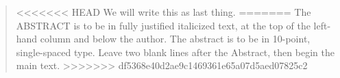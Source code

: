 \begin{abstract}
<<<<<<< HEAD
We will write this as last thing.
=======
The ABSTRACT is to be in fully justified italicized text, at the top of the left-hand column and below the author.
The abstract is to be in 10-point, single-spaced type.
Leave two blank lines after the Abstract, then begin the main text.
>>>>>>> df5368e40d2ae9c1469361e65a07d5aed07825c2
\end{abstract}